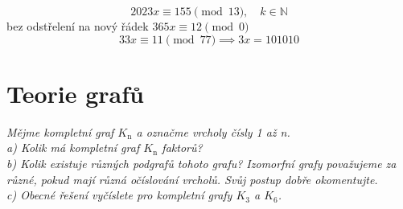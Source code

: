 \documentclass[a4paper, 10pt, oneside]{article}       %
\begin{document}
$$2023x\equiv 155\pmod{13},\quad k\in\mathbb{N}$$
bez odstřelení na nový řádek $365x \equiv 12 \pmod{0}$
\[33x\equiv 11\pmod{77}\implies 3x=101010\]

\newpage
\section{Teorie grafů}\label{sec:sec_2}

\textit{Mějme kompletní graf $K_{\text{n}}$ a označme vrcholy čísly 1 až n.\\
a) Kolik má kompletní graf $K_{\text{n}}$ faktorů?\\
b) Kolik existuje různých podgrafů tohoto grafu? Izomorfní grafy považujeme za různé, pokud mají různá očíslování vrcholů. Svůj postup dobře okomentujte.\\
c) Obecné řešení vyčíslete pro kompletní grafy $K_{\text{3}}$ a $K_{\text{6}}$.}
\end{document}
